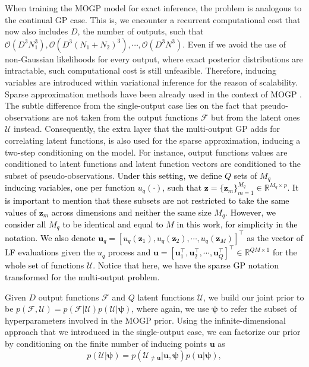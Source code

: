 \documentclass[]{article}
\def\u{{\mathbf u}}
\newcommand{\Rbb}{\mathbb{R}}
\newcommand{\Fcal}{\mathcal{F}}
\newcommand{\Ucal}{\mathcal{U}}
\newcommand{\Ocal}{\mathcal{O}}
\newcommand{\zc}{\bm{z}}
\begin{document}
When training the MOGP model for exact inference, the problem is analogous to the continual GP case. This is, we encounter a recurrent  computational cost that now also includes $D$, the number of outputs, such that $\Ocal(D^3N_1^3), \Ocal(D^3(N_1+N_2)^3), \cdots, \Ocal(D^3N^3)$. Even if we avoid the use of non-Gaussian likelihoods for every output, where exact posterior distributions are intractable, such computational cost is still unfeasible. Therefore, inducing variables are introduced within variational inference for the reason of scalability. Sparse approximation methods have been already used in the context of MOGP \citep{alvarez2009sparse,alvarez2010efficient,morenomunoz2018}. The subtle difference from the single-output case lies on the fact that pseudo-observations are not taken from the output functions $\Fcal$ but from the latent ones $\Ucal$ instead. Consequently, the extra layer that the multi-output GP adds for correlating latent functions, is also used for the sparse approximation, inducing a two-step conditioning on the model. For instance, output functions  values are conditioned to latent functions and latent function vectors are conditioned to the subset of pseudo-observations. \textcolor{black}{Under this setting, we define $Q$ sets of $M_q$ inducing variables, one per function $u_q(\cdot)$, such that $\zc = \{\zc_m\}^{M_q}_{m=1} \in \Rbb^{M_q\times p}$. It is important to mention that these subsets are not restricted to take the same values of $\zc_m$ across dimensions and neither the same size $M_q$.  However, we consider all $M_q$ to be identical and equal to $M$ in this work, for simplicity in the notation. We also denote $\u_q =[u_q(\zc_1), u_q(\zc_2), \cdots, u_q(\zc_{M})]^\top$ as the vector of LF evaluations given the $u_q$ process and  $\u = [\u^\top_1, \u^\top_2, \cdots, \u^\top_Q]^\top \in \Rbb^{QM\times 1}$ for the whole set of functions $\Ucal$. Notice that here, we have the sparse GP notation transformed for the multi-output problem.}

Given $D$ output functions $\Fcal$ and $Q$ latent functions $\Ucal$, we build our joint prior to be $p(\Fcal, \Ucal) = p(\Fcal| \Ucal)p(\Ucal|\bm{\psi})$, where again, we use $\bm{\psi}$ to refer the subset of hyperparameters involved in the MOGP prior. Using the infinite-dimensional approach that we introduced in the single-output case, we can factorize our prior by conditioning on the finite number of inducing points $\u$ as
\begin{equation}
	p(\Ucal|\bm{\psi}) = p(\Ucal_{\neq \u}|\u, \bm{\psi})p(\u|\bm{\psi}),
\end{equation}
\end{document}
